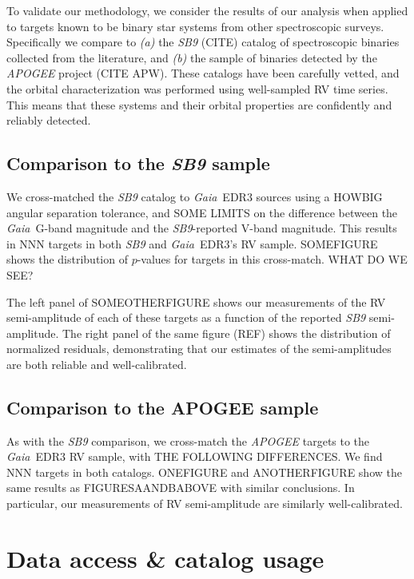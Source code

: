 \documentclass[modern, letterpaper]{aastex631}
\newcommand{\project}[1]{\textsl{#1}}
\newcommand{\Gaia}{\project{Gaia}}
\begin{document}
To validate our methodology, we consider the results of our analysis when applied to targets known to be binary star systems from other spectroscopic surveys.
Specifically we compare to \emph{(a)} the \project{SB9} (CITE) catalog of spectroscopic binaries collected from the literature, and \emph{(b)} the sample of binaries detected by the \project{APOGEE} project (CITE APW).
These catalogs have been carefully vetted, and the orbital characterization was performed using well-sampled RV time series.
This means that these systems and their orbital properties are confidently and reliably detected.

\subsection{Comparison to the \project{SB9} sample}

We cross-matched the \project{SB9} catalog to \Gaia\ EDR3 sources using a HOWBIG angular separation tolerance, and SOME LIMITS on the difference between the \Gaia\ G-band magnitude and the \project{SB9}-reported V-band magnitude.
This results in NNN targets in both \project{SB9} and \Gaia\ EDR3's RV sample.
SOMEFIGURE shows the distribution of $p$-values for targets in this cross-match.
WHAT DO WE SEE?

The left panel of SOMEOTHERFIGURE shows our measurements of the RV semi-amplitude of each of these targets as a function of the reported \project{SB9} semi-amplitude.
The right panel of the same figure (REF) shows the distribution of normalized residuals, demonstrating that our estimates of the semi-amplitudes are both reliable and well-calibrated.

\subsection{Comparison to the APOGEE sample}

As with the \project{SB9} comparison, we cross-match the \project{APOGEE} targets to the \Gaia\ EDR3 RV sample, with THE FOLLOWING DIFFERENCES.
We find NNN targets in both catalogs.
ONEFIGURE and ANOTHERFIGURE show the same results as FIGURESAANDBABOVE with similar conclusions.
In particular, our measurements of RV semi-amplitude are similarly well-calibrated.

\section{Data access \& catalog usage}
\end{document}
